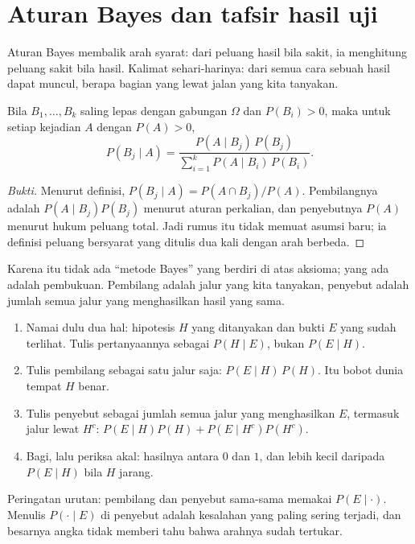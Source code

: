 \section{Aturan Bayes dan tafsir hasil uji}

Aturan Bayes membalik arah syarat: dari peluang hasil bila sakit, ia menghitung peluang
sakit bila hasil. Kalimat sehari-harinya: dari semua cara sebuah hasil dapat muncul,
berapa bagian yang lewat jalan yang kita tanyakan.


\begin{teorema}
Bila $B_{1},\dots,B_{k}$ saling lepas dengan gabungan $\Omega$ dan $P(B_{i})>0$, maka
untuk setiap kejadian $A$ dengan $P(A)>0$,
\[
P(B_{j}\mid A)=\frac{P(A\mid B_{j})\,P(B_{j})}
{\sum_{i=1}^{k}P(A\mid B_{i})\,P(B_{i})}.
\]
\end{teorema}

\begin{proof}[Bukti]
Menurut definisi, $P(B_{j}\mid A)=P(A\cap B_{j})/P(A)$. Pembilangnya adalah
$P(A\mid B_{j})P(B_{j})$ menurut aturan perkalian, dan penyebutnya $P(A)$ menurut hukum
peluang total. Jadi rumus itu tidak memuat asumsi baru; ia definisi peluang bersyarat
yang ditulis dua kali dengan arah berbeda.
\end{proof}

Karena itu tidak ada ``metode Bayes'' yang berdiri di atas aksioma; yang ada adalah
pembukuan. Pembilang adalah jalur yang kita tanyakan, penyebut adalah jumlah semua jalur
yang menghasilkan hasil yang sama.

\begin{resep}
\begin{enumerate}
  \item Namai dulu dua hal: hipotesis $H$ yang ditanyakan dan bukti $E$ yang sudah
        terlihat. Tulis pertanyaannya sebagai $P(H\mid E)$, bukan $P(E\mid H)$.
  \item Tulis pembilang sebagai satu jalur saja: $P(E\mid H)\,P(H)$. Itu bobot dunia
        tempat $H$ benar.
  \item Tulis penyebut sebagai jumlah semua jalur yang menghasilkan $E$, termasuk jalur
        lewat $H^{c}$: $P(E\mid H)P(H)+P(E\mid H^{c})P(H^{c})$.
  \item Bagi, lalu periksa akal: hasilnya antara $0$ dan $1$, dan lebih kecil daripada
        $P(E\mid H)$ bila $H$ jarang.
\end{enumerate}
Peringatan urutan: pembilang dan penyebut sama-sama memakai $P(E\mid\cdot)$. Menulis
$P(\cdot\mid E)$ di penyebut adalah kesalahan yang paling sering terjadi, dan besarnya
angka tidak memberi tahu bahwa arahnya sudah tertukar.
\end{resep}


